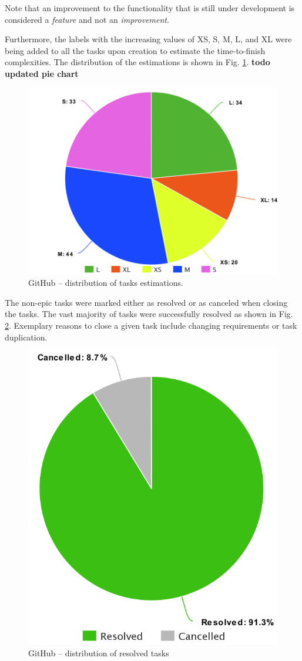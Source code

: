 \documentclass[a4paper,twoside,12pt]{book}
\begin{document}
Note that an improvement to the functionality that is still under development is considered a \textit{feature} and not an \textit{improvement}.

Furthermore, the labels with the increasing values of {XS}, {S}, {M}, {L}, and {XL} were being added to all the tasks upon creation to estimate the time-to-finish complexities. The distribution of the estimations is shown in Fig. \ref{fig:img:estimations}. \textbf{todo updated pie chart}

\begin{figure}
  \centering
  \includegraphics[width=0.65\linewidth]{img/github_issues_sizes.png}
  \caption{GitHub – distribution of tasks estimations.}
  \label{fig:img:estimations}
\end{figure}

The non-epic tasks were marked either as resolved or as canceled when closing the tasks. The vast majority of tasks were successfully resolved as shown in Fig. \ref{fig:img:resolved_tasks}. Exemplary reasons to close a given task include changing requirements or task duplication.

\begin{figure}
  \centering
  \includegraphics[width=0.5\linewidth]{img/github_issues_finished.png}
  \caption{GitHub – distribution of resolved tasks}
  \label{fig:img:resolved_tasks}
\end{figure}
\end{document}
